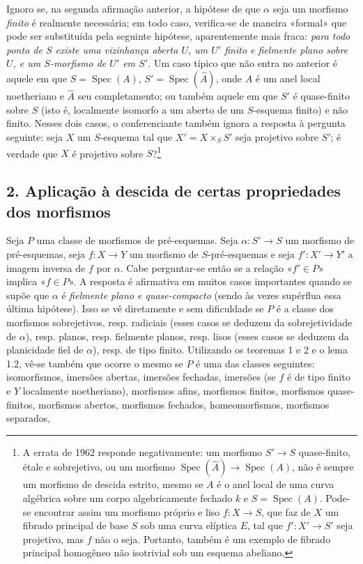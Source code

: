  Ignoro se, na segunda afirmação anterior, a
hipótese de que $\alpha$ seja um morfismo \emph{finito} é realmente necessária;
em todo caso, verifica-se de maneira «formal» que pode ser substituída pela
seguinte hipótese, aparentemente mais fraca: \emph{para todo ponto de $S$
existe uma vizinhança aberta $U$, um $U'$ finito e fielmente plano sobre $U$, e um
$S$-morfismo de $U'$ em $S'$.} Um caso típico que não entra no anterior é
aquele em que $S=\operatorname{Spec}(A)$,
$S'=\operatorname{Spec}(\widehat A)$, onde $A$ é um anel local noetheriano
e $\widehat A$ seu completamento; ou também aquele em que $S'$ é quase-finito sobre
$S$ (isto é, localmente isomorfo a um aberto de um $S$-esquema finito) e não
finito. Nesses dois casos, o conferenciante também ignora a resposta à
pergunta seguinte: seja $X$ um $S$-esquema tal que $X'=X\times_SS'$ seja
projetivo sobre $S'$; é verdade que $X$ é projetivo sobre
$S$?\footnote{A errata de 1962 responde negativamente: um morfismo
$S'\longrightarrow S$ quase-finito, étale e sobrejetivo, ou um morfismo
$\operatorname{Spec}(\widehat A)\longrightarrow\operatorname{Spec}(A)$, não é
sempre um morfismo de descida estrito, mesmo se $A$ é o anel local de
uma curva algébrica sobre um corpo algebricamente fechado $k$ e
$S=\operatorname{Spec}(A)$. Pode-se encontrar assim um morfismo próprio e liso
$f:X\longrightarrow S$, que faz de $X$ um fibrado principal de base $S$ sob
uma curva elíptica $E$, tal que $f':X'\longrightarrow S'$ seja projetivo, mas
$f$ não o seja. Portanto, também é um exemplo de fibrado principal homogêneo
não isotrivial sob um esquema abeliano.}

\subsection*{2. Aplicação à descida de certas propriedades dos morfismos}

Seja $P$ uma classe de morfismos de pré-esquemas. Seja
$\alpha:S'\longrightarrow S$ um morfismo de pré-esquemas, seja
$f:X\longrightarrow Y$ um morfismo de $S$-pré-esquemas e seja
$f':X'\longrightarrow Y'$ a imagem inversa de $f$ por $\alpha$. Cabe
perguntar-se então se a relação «$f'\in P$» implica «$f\in P$». A resposta é
afirmativa em muitos casos importantes quando se supõe que $\alpha$ é
\emph{fielmente plano e quase-compacto} (sendo às vezes supérflua essa última
hipótese). Isso se vê diretamente e sem dificuldade se $P$ é a classe dos
morfismos sobrejetivos, resp. radiciais (esses casos se deduzem da
sobrejetividade de $\alpha$), resp. planos, resp. fielmente planos, resp. lisos
(esses casos se deduzem da planicidade fiel de $\alpha$), resp. de tipo finito.
Utilizando os teoremas 1 e 2 e o lema 1.2, vê-se também que ocorre o mesmo se
$P$ é uma das classes seguintes: isomorfismos, imersões abertas, imersões
fechadas, imersões (se $f$ é de tipo finito e $Y$
localmente noetheriano), morfismos afins, morfismos finitos, morfismos
quase-finitos, morfismos abertos, morfismos fechados, homeomorfismos, morfismos
separados,


